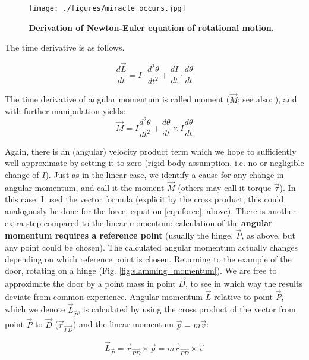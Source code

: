 \begin{figure}[p]
\centering
\texttt{[image: ./figures/miracle\_occurs.jpg]}
\caption{\label{fig:miracle}\textbf{Derivation of Newton-Euler equation of rotational motion.}}
\end{figure}



The time derivative is as follows.
\begin{change}
\[\frac{d\vec{L}}{dt} = I \cdot \frac{d^2 \theta}{d t^2} + \frac{d I}{d t} \cdot \frac{d\theta}{dt}\]
\end{change}

The time derivative of angular momentum is called moment (\(\vec{M}\); see also: \citet{WikipediaNewtonEuler,WikipediaTorque}), and with further manipulation \citep[details in][p. 242, eqn. 8.23; otherwise see Fig. \ref{fig:miracle}]{Lynch2017} yields:
\begin{equation}\label{eqn:moment}
\vec{M} = I \frac{d^2\theta}{dt^2} + \frac{d\theta}{dt} \times I\frac{d\theta}{dt}
\end{equation}


Again, there is an (angular) velocity product term which we hope to sufficiently well approximate by setting it to zero (rigid body assumption, i.e. no or negligible change of \(I\)).
Just as in the linear case, we identify a cause for any change in angular momentum, and call it the moment \(\vec{M}\) (others may call it torque \(\vec{\tau}\)).
In this case, I used the vector formula  (explicit by the cross product; this could analogously be done for the force, equation \eqref{eqn:force}, above).
There is another extra step compared to the linear momentum: calculation of the \textbf{angular momentum requires a reference point} (usually the hinge, \(\vec{P}\), as above, but any point could be chosen).
The calculated angular momentum actually changes depending on which reference point is chosen.
Returning to the example of the door, rotating on a hinge (Fig. \ref{fig:slamming_momentum}).
We are free to approximate the door by a point mass in point \(\vec{D}\), to see in which way the results deviate from common experience.
Angular momentum \(\vec{L}\) relative to point \(\vec{P}\), which we denote \(\vec{L}_{\vec{P}}\), is calculated by using the cross product of the vector from point \(\vec{P}\) to \(\vec{D}\) (\(\vec{r}_{\vec{PD}}\)) and the linear momentum \(\vec{p}=m\vec{v}\):
\begin{change}
\[\vec{L}_{\vec{P}} = \vec{r}_{\vec{PD}} \times \vec{p} = m \vec{r}_{\vec{PD}} \times \vec{v} \]
\end{change}

